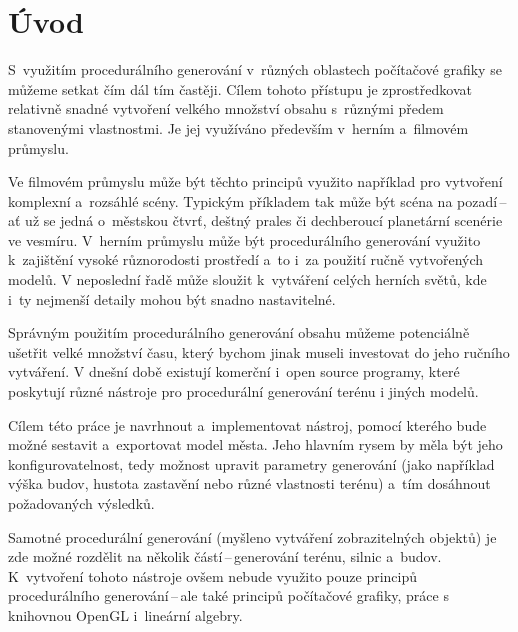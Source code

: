 
%
\chapter{Úvod}\label{ch:uvod}
S~využitím procedurálního generování v~různých oblastech počítačové grafiky se můžeme setkat čím dál tím častěji.
Cílem tohoto přístupu je zprostředkovat relativně snadné vytvoření velkého množství obsahu s~různými předem stanovenými vlastnostmi.
Je jej využíváno především v~herním a~filmovém průmyslu.

Ve filmovém průmyslu může být těchto principů využito například pro vytvoření komplexní a~rozsáhlé scény.
Typickým příkladem tak může být scéna na pozadí\,--\,ať už se jedná o~městskou čtvrť, deštný prales či dechberoucí planetární scenérie ve vesmíru.
V~herním průmyslu může být procedurálního generování využito k~zajištění vysoké různorodosti prostředí a~to i~za použití ručně vytvořených modelů.
V neposlední řadě může sloužit k~vytváření celých herních světů, kde i~ty nejmenší detaily mohou být snadno nastavitelné.

Správným použitím procedurálního generování obsahu můžeme potenciálně ušetřit velké množství času, který bychom jinak museli investovat do jeho ručního vytváření.
V dnešní době existují komerční i~open source programy, které poskytují různé nástroje pro procedurální generování terénu i jiných modelů.

Cílem této práce je navrhnout a~implementovat nástroj, pomocí kterého bude možné sestavit a~exportovat model města.
Jeho hlavním rysem by měla být jeho konfigurovatelnost, tedy možnost upravit parametry generování (jako například výška budov, hustota zastavění nebo různé vlastnosti terénu) a~tím dosáhnout požadovaných výsledků.

Samotné procedurální generování (myšleno vytváření zobrazitelných objektů) je zde možné rozdělit na několik částí\,--\,generování terénu, silnic a~budov.
K~vytvoření tohoto nástroje ovšem nebude využito pouze principů procedurálního generování\,--\,ale také principů počítačové grafiky, práce s knihovnou OpenGL i~lineární algebry.

